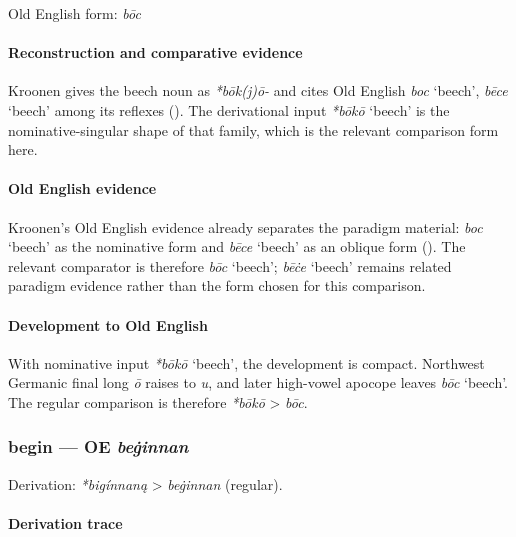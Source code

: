 \documentclass[
  british,
  a4paper,
]{article}
\providecommand{\Recon}[1]{\emph{*#1}}
\begin{document}
Old English form: \emph{bōc}

\paragraph{Reconstruction and comparative
evidence}\label{reconstruction-and-comparative-evidence-2}

Kroonen gives the beech noun as \emph{*bōk(j)ō-} and cites Old English
\emph{boc} `beech', {\emph{bēce}} `beech' among its reflexes
(). The derivational input
\Recon{bōkō} `beech' is the nominative-singular shape of that family,
which is the relevant comparison form here.

\paragraph{Old English evidence}\label{old-english-evidence-2}

Kroonen's Old English evidence already separates the paradigm material:
\emph{boc} `beech' as the nominative form and {\emph{bēce}} `beech' as
an oblique form (). The relevant
comparator is therefore \emph{bōc} `beech'; {\emph{bēċe}} `beech'
remains related paradigm evidence rather than the form chosen for this
comparison.

\paragraph{Development to Old
English}\label{development-to-old-english-2}

With nominative input \Recon{bōkō} `beech', the development is compact.
Northwest Germanic final long \emph{ō} raises to \emph{u}, and later
high-vowel apocope leaves \emph{bōc} `beech'. The regular comparison is
therefore \emph{*bōkō} \textgreater{} \emph{bōc}.

\subsubsection{\texorpdfstring{begin --- OE
\emph{beġinnan}}{begin --- OE beġinnan}}\label{begin-oe-beux121innan}

Derivation: \emph{*bigínnaną} \textgreater{} \emph{beġinnan} (regular).

\paragraph{Derivation trace}\label{derivation-trace-3}
\end{document}
